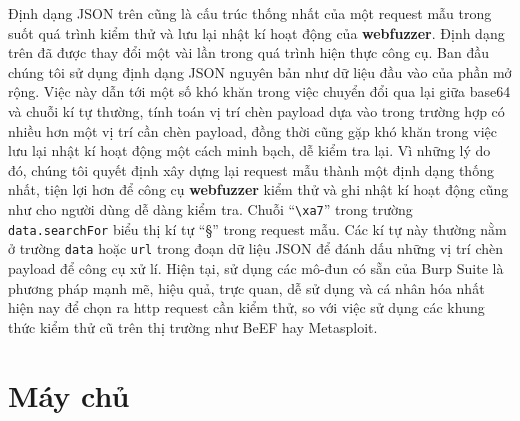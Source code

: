 Định dạng JSON trên cũng là cấu trúc thống nhất của một request mẫu trong suốt quá trình kiểm thử và lưu lại nhật kí hoạt động của \textbf{webfuzzer}. Định dạng trên đã được thay đổi một vài lần trong quá trình hiện thực công cụ. Ban đầu chúng tôi sử dụng định dạng JSON nguyên bản như dữ liệu đầu vào của phần mở rộng. Việc này dẫn tới một số khó khăn trong việc chuyển đổi qua lại giữa base64 và chuỗi kí tự thường, tính toán vị trí chèn payload dựa vào trong trường hợp có nhiều hơn một vị trí cần chèn payload, đồng thời cũng gặp khó khăn trong việc lưu lại nhật kí hoạt động một cách minh bạch, dễ kiểm tra lại. Vì những lý do đó, chúng tôi quyết định xây dựng lại request mẫu thành một định dạng thống nhất, tiện lợi hơn để công cụ \textbf{webfuzzer} kiểm thử và ghi nhật kí hoạt động cũng như cho người dùng dễ dàng kiểm tra. Chuỗi ``\texttt{\textbackslash xa7}'' trong trường \texttt{data.searchFor} biểu thị kí tự ``\S'' trong request mẫu. Các kí tự này thường nằm ở trường \texttt{data} hoặc \texttt{url} trong đoạn dữ liệu JSON để đánh dấu những vị trí chèn payload để công cụ xử lí. Hiện tại, sử dụng các mô-đun có sẵn của Burp Suite là phương pháp mạnh mẽ, hiệu quả, trực quan, dễ sử dụng và cá nhân hóa nhất hiện nay để chọn ra \acrshort{http} request cần kiểm thử, so với việc sử dụng các khung thức kiểm thử cũ trên thị trường như BeEF hay Metasploit. 

\section{Máy chủ}

